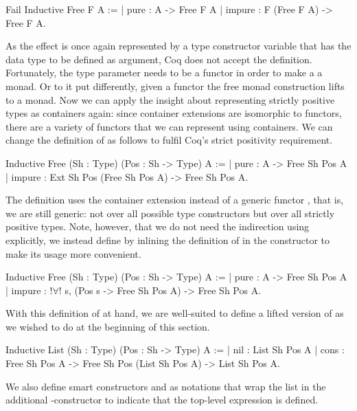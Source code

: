 \begin{coqcode}
Fail Inductive Free F A :=
| pure   : A -> Free F A
| impure : F (Free F A) -> Free F A.
\end{coqcode}

As the effect is once again represented by a type constructor variable  that has the data type to be defined as argument, Coq does not accept the definition.
Fortunately, the type parameter  needs to be a functor in order to make a  a monad.
Or to it put differently, given a functor  the free monad construction lifts  to a monad.
Now we can apply the insight about representing strictly positive types as containers again: since container extensions are isomorphic to functors, there are a variety of functors that we can represent using containers.
We can change the definition of  as follows to fulfil Coq's strict positivity requirement.

\begin{coqcode}
Inductive Free (Sh : Type) (Pos : Sh -> Type) A :=
| pure   : A -> Free Sh Pos A
| impure : Ext Sh Pos (Free Sh Pos A) -> Free Sh Pos A.
\end{coqcode}

The definition uses the container extension instead of a generic functor , that is, we are still generic: not over all possible type constructors but over all strictly positive types.
Note, however, that we do not need the indirection using  explicitly, we instead define  by inlining the definition of  in the constructor  to make its usage more convenient.

\begin{coqcode}
Inductive Free (Sh : Type) (Pos : Sh -> Type) A :=
| pure   : A -> Free Sh Pos A
| impure : !$\forall$! s, (Pos s -> Free Sh Pos A) -> Free Sh Pos A.
\end{coqcode}

With this definition of  at hand, we are well\--suited to define a lifted version of  as we wished to do at the beginning of this section.

\begin{coqcode}
Inductive List (Sh : Type) (Pos : Sh -> Type) A :=
| nil : List Sh Pos A
| cons : Free Sh Pos A -> Free Sh Pos (List Sh Pos A) -> List Sh Pos A.
\end{coqcode}

We also define smart constructors  and  as notations that wrap the list in the additional \--constructor to indicate that the top\--level expression is defined.

